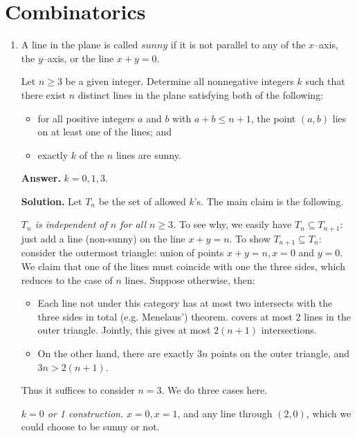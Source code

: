 \documentclass[11pt,a4paper]{article}
\begin{document}
    \section*{Combinatorics}
    \begin{enumerate}
    	\item [C1.]
    	A line in the plane is called $sunny$ if it is not parallel to any of the $x$–axis, the $y$–axis, or the line $x+y=0$.
    	
    	Let $n\ge3$ be a given integer. Determine all nonnegative integers $k$ such that there exist $n$ distinct lines in the plane satisfying both of the following:
    	\begin{itemize}
    		\item for all positive integers $a$ and $b$ with $a+b\le n+1$, the point $(a,b)$ lies on at least one of the lines; and
    		\item exactly $k$ of the $n$ lines are sunny.
    	\end{itemize}
    	
    	\textbf{Answer.} $k=0, 1, 3$. 
    	
    	\textbf{Solution.} Let $T_n$ be the set of allowed $k$'s. The main claim is the following. 
    	
    	\textit{$T_n$ is independent of $n$ for all $n\ge 3$. }
    	To see why, we easily have $T_n\subseteq T_{n+1}$: just add a line (non-sunny) on the line $x+y=n$. 
    	To show $T_{n+1}\subseteq T_n$: consider the outermost triangle: union of points $x+y=n, x=0$ and $y=0$. 
    	We claim that one of the lines must coincide with one the three sides, which reduces to the case of $n$ lines. 
    	Suppose otherwise, then: 
    	\begin{itemize}
    		\item Each line not under this category has at most two intersects with the three sides in total (e.g. Menelaus') theorem.
    		covers at most 2 lines in the outer triangle. Jointly, this gives at most $2(n+1)$ intersections. 
    		
    		\item On the other hand, there are exactly $3n$ points on the outer triangle, and $3n > 2(n+1)$. 
    	\end{itemize}
    	
    	Thus it suffices to consider $n = 3$. We do three cases here. 
    	
    	\textit{$k=0$ or 1 construction.} $x=0, x=1$, and any line through $(2, 0)$, which we could choose to be sunny or not.
    	

\end{enumerate}
\end{document}
